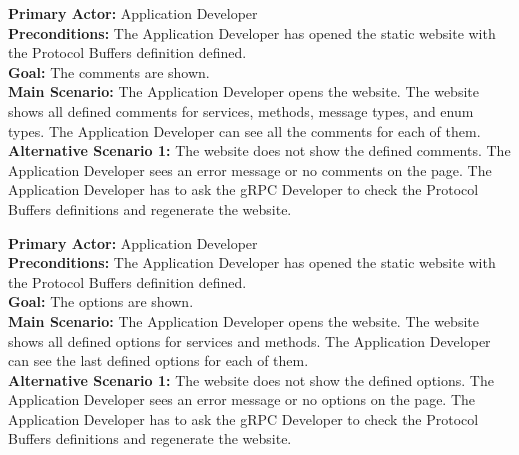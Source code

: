 
\textbf{Primary Actor:} Application Developer\\
\textbf{Preconditions:} The Application Developer has opened the static website with the Protocol Buffers definition defined.\\
\textbf{Goal:} The comments are shown.\\
\textbf{Main Scenario:}
The Application Developer opens the website.
The website shows all defined comments for services, methods, message types, and enum types.
The Application Developer can see all the comments for each of them.\\
\textbf{Alternative Scenario 1:}
The website does not show the defined comments.
The Application Developer sees an error message or no comments on the page.
The Application Developer has to ask the gRPC Developer to check the Protocol Buffers definitions and regenerate the website.


\textbf{Primary Actor:} Application Developer\\
\textbf{Preconditions:} The Application Developer has opened the static website with the Protocol Buffers definition defined.\\
\textbf{Goal:} The options are shown.\\
\textbf{Main Scenario:}
The Application Developer opens the website.
The website shows all defined options for services and methods.
The Application Developer can see the last defined options for each of them.\\
\textbf{Alternative Scenario 1:}
The website does not show the defined options.
The Application Developer sees an error message or no options on the page.
The Application Developer has to ask the gRPC Developer to check the Protocol Buffers definitions and regenerate the website.


